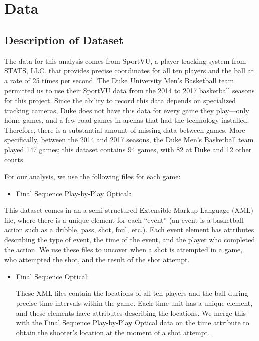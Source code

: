 \documentclass[12pt,twoside]{dukestatscithesis}
\providecommand{\tightlist}{%
  \setlength{\itemsep}{0pt}\setlength{\parskip}{0pt}}
\theoremstyle{definition}
\theoremstyle{definition}
\theoremstyle{definition}
\theoremstyle{remark}
\begin{document}
\chapter{Data}\label{data}

\section{Description of Dataset}\label{description-of-dataset}

The data for this analysis comes from SportVU, a player-tracking system
from STATS, LLC. that provides precise coordinates for all ten players
and the ball at a rate of 25 times per second. The Duke University Men's
Basketball team permitted us to use their SportVU data from the 2014 to
2017 basketball seasons for this project. Since the ability to record
this data depends on specialized tracking cameras, Duke does not have
this data for every game they play---only home games, and a few road
games in arenas that had the technology installed. Therefore, there is a
substantial amount of missing data between games. More specifically,
between the 2014 and 2017 seasons, the Duke Men's Basketball team played
147 games; this dataset contains 94 games, with 82 at Duke and 12 other
courts.

For our analysis, we use the following files for each game:
\begin{itemize}
\tightlist
\item
  Final Sequence Play-by-Play Optical:
\end{itemize}
This dataset comes in an a semi-structured Extensible Markup Language
(XML) file, where there is a unique element for each ``event'' (an event
is a basketball action such as a dribble, pass, shot, foul, etc.). Each
event element has attributes describing the type of event, the time of
the event, and the player who completed the action. We use these files
to uncover when a shot is attempted in a game, who attempted the shot,
and the result of the shot attempt.
\begin{itemize}
\item
  Final Sequence Optical:

  These XML files contain the locations of all ten players and the ball
  during precise time intervals within the game. Each time unit has a
  unique element, and these elements have attributes describing the
  locations. We merge this with the Final Sequence Play-by-Play Optical
  data on the time attribute to obtain the shooter's location at the
  moment of a shot attempt.
\end{itemize}
\end{document}
